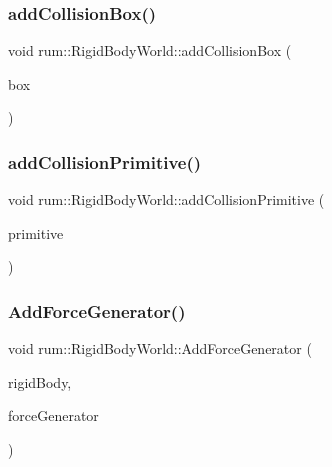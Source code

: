 \subsubsection{\texorpdfstring{add\+Collision\+Box()}{addCollisionBox()}}
{\footnotesize\ttfamily void rum\+::\+Rigid\+Body\+World\+::add\+Collision\+Box (\begin{DoxyParamCaption}\item[{\hyperlink{classrum_1_1_collision_box}{Collision\+Box} $\ast$}]{box }\end{DoxyParamCaption})}

\mbox{\label{classrum_1_1_rigid_body_world_a812a6ce6c6a1b577cf2cd8ef8d1fb525}} 
\subsubsection{\texorpdfstring{add\+Collision\+Primitive()}{addCollisionPrimitive()}}
{\footnotesize\ttfamily void rum\+::\+Rigid\+Body\+World\+::add\+Collision\+Primitive (\begin{DoxyParamCaption}\item[{\hyperlink{classrum_1_1_collision_primitive}{Collision\+Primitive} $\ast$}]{primitive }\end{DoxyParamCaption})}

\mbox{\label{classrum_1_1_rigid_body_world_ac31792a35fd305feb3b78317595b6a88}} 
\subsubsection{\texorpdfstring{Add\+Force\+Generator()}{AddForceGenerator()}}
{\footnotesize\ttfamily void rum\+::\+Rigid\+Body\+World\+::\+Add\+Force\+Generator (\begin{DoxyParamCaption}\item[{\hyperlink{classrum_1_1_rigid_body}{Rigid\+Body} $\ast$}]{rigid\+Body,  }\item[{\hyperlink{classrum_1_1_force_generator}{Force\+Generator} $\ast$}]{force\+Generator }\end{DoxyParamCaption})}

